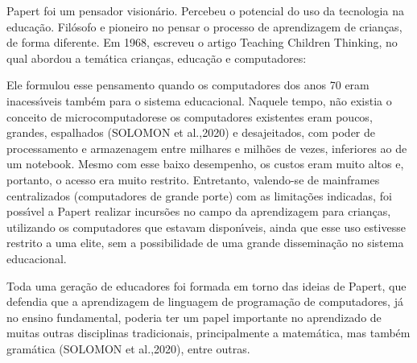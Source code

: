\documentclass[
12pt,		%
openright,	%
twoside,  %
a4paper,			%
chapter=TITLE,		%
english,			%
french,				%
spanish,			%
brazil				%
]{USPSC-classe/USPSC}
\begin{document}
Papert foi um pensador vision\'ario. Percebeu o potencial do uso da tecnologia na educa\c{c}\~ao. Fil\'osofo e pioneiro no pensar o processo de aprendizagem de crian\c{c}as, de forma diferente. Em 1968, escreveu o artigo \textquotedbl Teaching Children Thinking\textquotedbl , no qual abordou a tem\'atica crian\c{c}as, educa\c{c}\~ao e computadores:










\noindent\begin{center}\mbox{\centering{}}\end{center}


Ele formulou esse pensamento quando os computadores dos anos 70 eram inacess\'{\i}veis tamb\'em para o sistema educacional. Naquele tempo, n\~ao existia o conceito de \textquotedbl microcomputadores\textquotedbl  e os computadores existentes eram poucos, grandes, espalhados  (SOLOMON et al.,2020) e desajeitados, com poder de processamento e armazenagem entre milhares e milh\~oes de vezes, inferiores ao de um notebook. Mesmo com esse baixo desempenho, os custos eram muito altos e, portanto, o acesso era muito restrito. Entretanto, valendo-se de mainframes centralizados (computadores de grande porte) com as limita\c{c}\~oes indicadas, foi poss\'{\i}vel a Papert realizar incurs\~oes no campo da aprendizagem para crian\c{c}as, utilizando os computadores que estavam dispon\'{\i}veis, ainda que esse uso estivesse restrito a uma elite, sem a possibilidade de uma grande dissemina\c{c}\~ao no sistema educacional.









Toda uma gera\c{c}\~ao de educadores foi formada em torno das ideias de Papert, que defendia que a aprendizagem de linguagem de programa\c{c}\~ao de computadores, j\'a no ensino fundamental, poderia ter um papel importante no aprendizado de muitas outras disciplinas tradicionais, principalmente a matem\'atica, mas tamb\'em gram\'atica (SOLOMON et al.,2020), entre outras.
\end{document}
